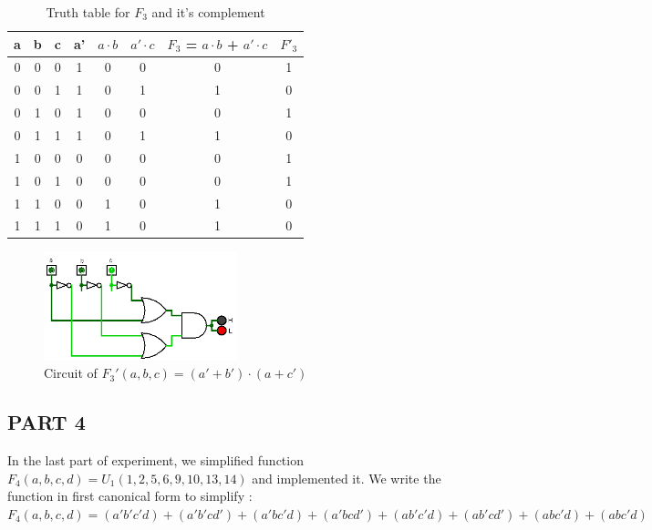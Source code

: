 \documentclass[pdftex,12pt,a4paper]{article}
\begin{document}
\begin{table}[h]
\centering
\begin{tabular}{|c|c|c|c|c|c|c|c|}
\hline
a & b & c & a' & $a \cdot b$ & $a' \cdot c$ & $F_{3}$ = $a \cdot b$ + $a' \cdot c$ & $F'_{3}$ \\ \hline
0 & 0 & 0 & 1  & 0     & 0      & 0                        & 1        \\ 
0 & 0 & 1 & 1  & 0     & 1      & 1                        & 0        \\ 
0 & 1 & 0 & 1  & 0     & 0      & 0                        & 1        \\ 
0 & 1 & 1 & 1  & 0     & 1      & 1                        & 0        \\ 
1 & 0 & 0 & 0  & 0     & 0      & 0                        & 1        \\ 
1 & 0 & 1 & 0  & 0     & 0      & 0                        & 1        \\
1 & 1 & 0 & 0  & 1     & 0      & 1                        & 0        \\ 
1 & 1 & 1 & 0  & 1     & 0      & 1                        & 0        \\ \hline
\end{tabular}
\caption{Truth table for $F_3$ and it's complement}
\label{fig3}
\end{table}

\begin{figure}[ht]
	\centering
	\includegraphics[width=0.5\textwidth]{2_3.png}	
	\caption{Circuit of $F_3'(a,b,c) = (a' + b') \cdot (a + c')$}
	\label{fig1}
\end{figure}

\subsection{PART 4}
In the last part of experiment, we simplified function $F_4(a,b,c,d) = U_1(1,2,5,6,9,10,13,14)$ and implemented it. We write the function in first canonical form to simplify :\\

$F_{4}(a,b,c,d) = (a'b'c'd) + (a'b'cd') + (a'bc'd) + (a'bcd') + (ab'c'd) + (ab'cd') + (abc'd) + (abc'd)$\\
\end{document}
